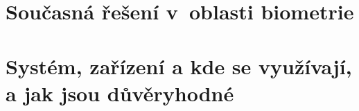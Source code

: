 \section{Současná řešení v~oblasti biometrie}



\section{Systém, zařízení a kde se využívají, a jak jsou důvěryhodné}

